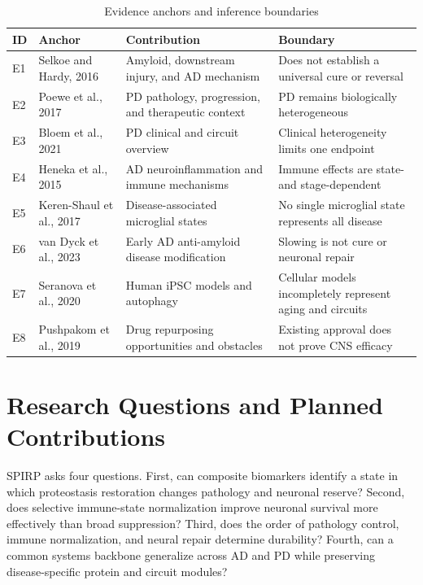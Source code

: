 \documentclass[conference]{IEEEtran}
\begin{document}
\begin{table}[t]
\caption{Evidence anchors and inference boundaries}
\label{tab:evidence}
\centering
\small
\begin{tabularx}{\textwidth}{p{}p{}p{}X}
\toprule
ID & Anchor & Contribution & Boundary \\
\midrule
E1 & Selkoe and Hardy, 2016 \cite{selkoe2016} & Amyloid, downstream injury, and AD mechanism & Does not establish a universal cure or reversal \\
E2 & Poewe et al., 2017 \cite{poewe2017} & PD pathology, progression, and therapeutic context & PD remains biologically heterogeneous \\
E3 & Bloem et al., 2021 \cite{bloem2021} & PD clinical and circuit overview & Clinical heterogeneity limits one endpoint \\
E4 & Heneka et al., 2015 \cite{heneka2015} & AD neuroinflammation and immune mechanisms & Immune effects are state- and stage-dependent \\
E5 & Keren-Shaul et al., 2017 \cite{keren2017} & Disease-associated microglial states & No single microglial state represents all disease \\
E6 & van Dyck et al., 2023 \cite{vandyk2023} & Early AD anti-amyloid disease modification & Slowing is not cure or neuronal repair \\
E7 & Seranova et al., 2020 \cite{seranova2020} & Human iPSC models and autophagy & Cellular models incompletely represent aging and circuits \\
E8 & Pushpakom et al., 2019 \cite{pushpakom2019} & Drug repurposing opportunities and obstacles & Existing approval does not prove CNS efficacy \\
\bottomrule
\end{tabularx}
\end{table}

\section{Research Questions and Planned Contributions}
SPIRP asks four questions. First, can composite biomarkers identify a state in which proteostasis restoration changes pathology and neuronal reserve? Second, does selective immune-state normalization improve neuronal survival more effectively than broad suppression? Third, does the order of pathology control, immune normalization, and neural repair determine durability? Fourth, can a common systems backbone generalize across AD and PD while preserving disease-specific protein and circuit modules?
\end{document}
